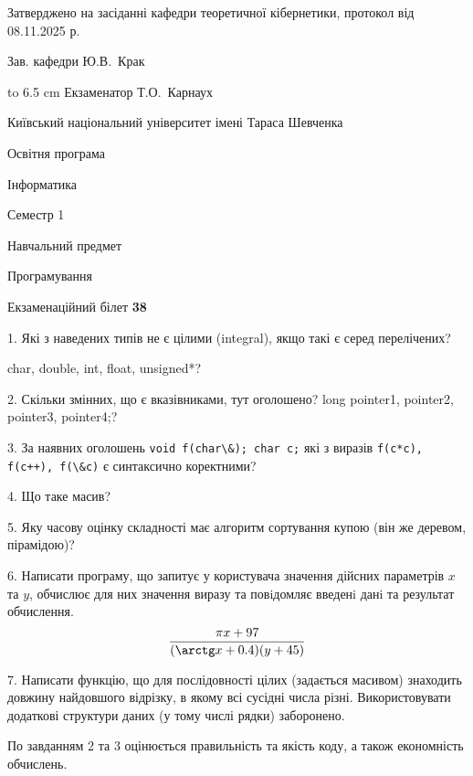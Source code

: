 \documentclass[12pt, ukrainian]{article}
\def\code#1{\Verb!#1!}
\begin{document}
{\smallskip\smallskip \begin {scriptsize} Затверджено на засіданні кафедри теоретичної кібернетики, протокол   від   08.11.2025 р.\par\smallskip\smallskip\smallskip\smallskip
{\parbox {6.5 cm} {Зав. кафедри \dotfill Ю.В.~Крак}}\hspace {0.7cm} {\hbox to 6.5 cm { Екзаменатор \dotfill Т.О.~Карнаух}} \end{scriptsize}}
\vspace{0.9cm}
{{\begin {scriptsize}\par
{ \center  Київський національний університет імені Тараса Шевченка \par}
{\parbox {5 cm}{Освітня програма \hfill}{\parbox {7 cm}{Інформатика\hfill}}\parbox {6 cm}{\hfill Семестр 1}}\par
{\parbox {5 cm} {Навчальний предмет \hfill}\parbox {7 cm}{Програмування \hfill}\parbox {6cm}{\hfill}\par}\vspace{-15pt} \end{scriptsize}}{\center Екзаменаційний білет \No \textbf { 38 }\par}}
{%
1. Які з наведених типів не є цілими (integral), якщо такі є серед перелічених?

char, double, int, float, unsigned*?
\par
\vspace{2mm}
2. Скільки змінних, що є вказівниками, тут оголошено?
long pointer1, pointer2, pointer3, pointer4;?
\par
\vspace{2mm}
3. За наявних оголошень \code{void f(char\&); char c;} які з виразів \code{f(c*c), f(c++), f(\&c)} є синтаксично коректними?
\par
\vspace{2mm}
4. Що таке масив?
\par
\vspace{2mm}
5. Яку часову оцінку складності має алгоритм сортування купою (він же деревом, пірамідою)?
\par
\vspace{2mm}
6. Написати програму, що запитує у користувача значення дійсних параметрів $x$ та $y$, обчислює для них значення виразу та повiдомляє введенi данi та результат обчислення.
$$\frac{\pi x + 97}{(\arctg x + 0.4) (y + 45)}$$ 

\par
7. Написати функцію, що для послідовності цілих (задається масивом) знаходить довжину найдовшого відрізку, в якому всі сусідні числа різні. Використовувати додаткові структури даних (у тому числі рядки) заборонено.

По завданням 2 та 3 оцінюється правильність та якість коду, а також економність обчислень.

}
\end{document}
